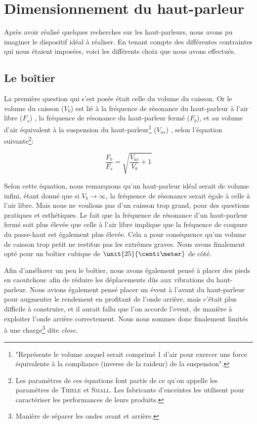 



\section{Dimensionnement du haut-parleur}

Après avoir réalisé quelques recherches sur les haut-parleurs, nous avons pu imaginer le dispositif idéal
à réaliser. En tenant compte des différentes contraintes qui nous étaient imposées, voici les différents
choix que nous avons effectués.

\subsection{Le boîtier}
La première question qui s'est posée était celle du volume du caisson. Or le volume du caisson ($V_b$) est
lié à la fréquence de résonance du
haut-parleur à l'air libre ($F_s$) , la fréquence de résonance du haut-parleur fermé ($F_b$), et au volume
d'air équivalent à la suspension du haut-parleur\footnote{"Représente le volume auquel serait comprimé
\unit{1}{\meter\cubed} d'air pour exercer une force équivalente à la compliance (inverse de la raideur) de la suspension"\cite{Vas}.}
($V_{as}$) , selon l'équation suivante\footnote{Les paramètres de ces équations font partie de ce qu'on appelle les paramètres de \textsc{Thiele} et \textsc{Small}. 
Les fabricants d'enceintes les utilisent pour caractériser les performances de leurs produits.}\cite{Vas}:

$$\frac{F_b}{F_s} = \sqrt{\frac{V_{as}}{V_b} + 1}$$


Selon cette équation, nous remarquons qu'un haut-parleur idéal serait de volume infini, étant donné que si $V_b\rightarrow \infty$, la fréquence de résonance serait égale à celle à l'air libre. Mais nous ne voulions pas d'un caisson trop grand, pour des questions pratiques et esthétiques.
Le fait que la fréquence de résonance d'un haut-parleur fermé soit plus élevée que celle à l'air libre implique que
la fréquence de coupure du passe-haut est également plus élevée. Cela a pour conséquence
qu'un volume de caisson trop petit ne restitue pas les extrêmes graves. Nous avons finalement opté pour un boîtier
cubique de $\unit{25}{\centi\meter}$ de côté.

Afin d'améliorer un peu le boîtier, nous avons également pensé à placer des pieds en caoutchouc afin de
réduire les déplacements dûs aux vibrations du haut-parleur. Nous avions également pensé placer un évent à l'avant du haut-parleur
pour augmenter le rendement en profitant de l'onde arrière, mais c'était plus difficile à construire, et
il aurait fallu que l'on accorde l'event, de manière à exploiter l'onde arrière correctement. Nous nous
sommes donc finalement limités à une charge\footnote{Manière de séparer les ondes avant et arrière.} dite
\textit{close}\cite{close}.



